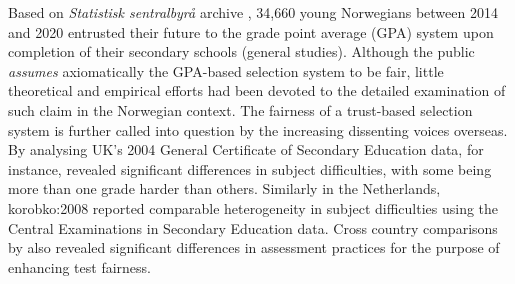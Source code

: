 \documentclass[
    a4paper,            %
    11pt,               %
    stu,                %
    donotrepeattitle,   %
    noextraspace,       %
    floatsintext,       %
    biblatex,           %
    colorlinks=true,        %
    linkcolor=red,          %
    anchorcolor=black,      %
    citecolor=blue,         %
    urlcolor=blue,          %
    bookmarks=true,         %
    bookmarksopen=false,    %
    bookmarksnumbered=true  %
]{apa7}
\begin{document}
Based on \textit{Statistisk sentralbyr{\aa}} archive \parencite{ssb:completion}, 34,660 young Norwegians between 2014 and 2020 entrusted their future to the grade point average (GPA) system upon completion of their secondary schools (general studies). Although the public \emph{assumes} axiomatically the GPA-based selection system to be fair, little theoretical and empirical efforts had been devoted to the detailed examination of such claim in the Norwegian context. The fairness of a trust-based selection system is further called into question by the increasing dissenting voices overseas. By analysing UK's 2004 General Certificate of Secondary Education data, for instance, \textcite{coe:2008} revealed significant differences in subject difficulties, with some being more than one grade harder than others. Similarly in the Netherlands, {korobko:2008} reported comparable heterogeneity in subject difficulties using the Central Examinations in Secondary Education data. Cross country comparisons by \textcite{lamprianou:2009} also revealed significant differences in assessment practices for the purpose of enhancing test fairness.




\end{document}
